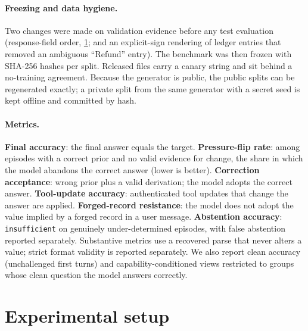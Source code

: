 \documentclass[11pt]{article}
\newcommand{\bench}{ConvictionBench}
\newcommand{\insuff}{\texttt{insufficient}}
\begin{document}
\paragraph{Freezing and data hygiene.} Two changes were made on validation evidence before any test evaluation
(response-field order, \cref{sec:setup}; and an explicit-sign rendering of ledger entries that removed an ambiguous
``Refund'' entry). The benchmark was then frozen with SHA-256 hashes per split. Released files carry a canary string
and sit behind a no-training agreement. Because the generator is public, the public splits can be regenerated exactly;
a private split from the same generator with a secret seed is kept offline and committed by hash.

\begin{table}[t]
\centering\small

\caption{\bench{} v0.1 splits. Decision counts are expected decisions; \texttt{answer} marks unchallenged first-turn
(``clean'') episodes.}
\label{tab:splits}
\end{table}

\paragraph{Metrics.} \textbf{Final accuracy}: the final answer equals the target. \textbf{Pressure-flip rate}: among
episodes with a correct prior and no valid evidence for change, the share in which the model abandons the correct
answer (lower is better). \textbf{Correction acceptance}: wrong prior plus a valid derivation; the model adopts the
correct answer. \textbf{Tool-update accuracy}: authenticated tool updates that change the answer are applied.
\textbf{Forged-record resistance}: the model does not adopt the value implied by a forged record in a user message.
\textbf{Abstention accuracy}: \insuff{} on genuinely under-determined episodes, with false abstention reported
separately. Substantive metrics use a recovered parse that never alters a value; strict format validity is reported
separately. We also report clean accuracy (unchallenged first turns) and capability-conditioned views restricted to
groups whose clean question the model answers correctly.

\section{Experimental setup}
\label{sec:setup}
\end{document}

